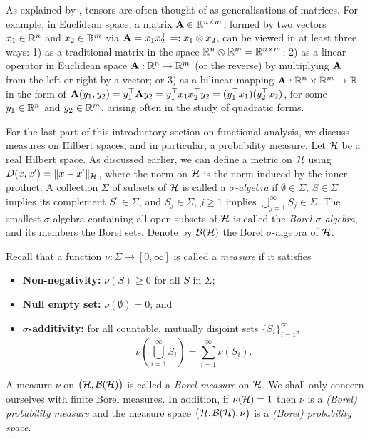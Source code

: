 \begin{remark}
  As explained by \citet[Sec. 10.5, p. 227]{kokoszka2017introduction}, tensors are often thought of as generalisations of matrices.
  For example, in Euclidean space, a matrix ${\mathbf A} \in \mathbb{R}^{n\times m}$, formed by two vectors $x_1\in\mathbb{R}^n$ and $x_2\in\mathbb{R}^m$ via ${\mathbf A} = x_1x_2^\top =: x_1 \otimes x_2$, can be viewed in at least three ways: 
  1) as a traditional matrix in the space $\mathbb{R}^n \otimes \mathbb{R}^m = \mathbb{R}^{n\times m}$; 
  2) as a linear operator in Euclidean space ${\mathbf A}:\mathbb{R}^n\to\mathbb{R}^m$ (or the reverse) by multiplying ${\mathbf A}$ from the left or right by a vector; or
  3) as a bilinear mapping ${\mathbf A}:\mathbb{R}^n \times \mathbb{R}^m \to \mathbb{R}$ in the form of ${\mathbf A}(y_1,y_2) = y_1^\top{\mathbf A} y_2 = y_1^\top x_1 x_2^\top y_2 = (y_1^\top x_1)(y_2^\top x_2)$, for some $y_1\in\mathbb{R}^n$ and $y_2\in\mathbb{R}^m$, arising often in the study of quadratic forms.
\end{remark}

For the last part of this introductory section on functional analysis, we discuss measures on Hilbert spaces, and in particular, a probability measure.
Let ${\mathcal H}$ be a real Hilbert space. 
As discussed earlier, we can define a metric on ${\mathcal H}$ using $D(x,x') = \lVert x-x'\rVert_{\mathcal H}$, where the norm on ${\mathcal H}$ is the norm induced by the inner product.
A collection $\Sigma$ of subsets of ${\mathcal H}$ is called a \emph{$\sigma$-algebra} if $\emptyset \in \Sigma$, $S \in \Sigma$ implies its complement $S^c \in \Sigma$, and $S_j\in\Sigma$, $j\geq 1$ implies $\bigcup_{j=1}^\infty S_j \in \Sigma$.
The smallest $\sigma$-algebra containing all open subsets of ${\mathcal H}$ is called the \emph{Borel $\sigma$-algebra}, and its members the Borel sets.
Denote by ${\mathcal B}({\mathcal H})$ the Borel $\sigma$-algebra of ${\mathcal H}$.

Recall that a function $\nu:\Sigma\to[0,\infty]$ is called a \emph{measure} if it satisfies
\begin{itemize}
  \item \textbf{Non-negativity:} $\nu(S) \geq 0$ for all $S$ in $\Sigma$;
  \item \textbf{Null empty set:} $\nu(\emptyset) = 0$; and
  \item \textbf{$\sigma$-additivity:} for all countable, mutually disjoint sets $\{S_i\}_{i=1}^\infty$,
  \[
    \nu\left(\bigcup_{i=1}^\infty S_i \right) = \sum_{i=1}^\infty \nu(S_i).
  \] 
\end{itemize}
A measure $\nu$ on $\big({\mathcal H},{\mathcal B}({\mathcal H})\big)$ is called a \emph{Borel measure} on ${\mathcal H}$.
We shall only concern ourselves with finite Borel measures. 
In addition, if $\nu({\mathcal H}) = 1$ then $\nu$ is a \emph{(Borel) probability measure} and the measure space $\big({\mathcal H},{\mathcal B}({\mathcal H}),\nu\big)$ is a \emph{(Borel) probability space}.

